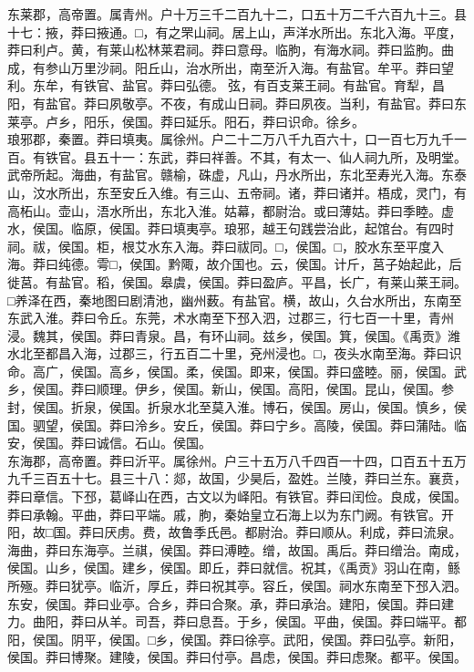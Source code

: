 \documentclass[]{article}
\begin{document}
东莱郡，高帝置。属青州。户十万三千二百九十二，口五十万二千六百九十三。县十七：掖，莽曰掖通。□，有之罘山祠。居上山，声洋水所出。东北入海。平度，莽曰利卢。黄，有莱山松林莱君祠。莽曰意母。临朐，有海水祠。莽曰监朐。曲成，有参山万里沙祠。阳丘山，治水所出，南至沂入海。有盐官。牟平。莽曰望利。东牟，有铁官、盐官。莽曰弘德。弦，有百支莱王祠。有盐官。育犁，昌阳，有盐官。莽曰夙敬亭。不夜，有成山日祠。莽曰夙夜。当利，有盐官。莽曰东莱亭。卢乡，阳乐，侯国。莽曰延乐。阳石，莽曰识命。徐乡。\\
琅邪郡，秦置。莽曰填夷。属徐州。户二十二万八千九百六十，口一百七万九千一百。有铁官。县五十一：东武，莽曰祥善。不其，有太一、仙人祠九所，及明堂。武帝所起。海曲，有盐官。赣榆，硃虚，凡山，丹水所出，东北至寿光入海。东泰山，汶水所出，东至安丘入维。有三山、五帝祠。诸，莽曰诸并。梧成，灵门，有高柘山。壶山，浯水所出，东北入淮。姑幕，都尉治。或曰薄姑。莽曰季睦。虚水，侯国。临原，侯国。莽曰填夷亭。琅邪，越王句践尝治此，起馆台。有四时祠。祓，侯国。柜，根艾水东入海。莽曰祓同。□，侯国。□，胶水东至平度入海。莽曰纯德。雩□，侯国。黔陬，故介国也。云，侯国。计斤，莒子始起此，后徙莒。有盐官。稻，侯国。皋虞，侯国。莽曰盈庐。平昌，长广，有莱山莱王祠。□养泽在西，秦地图曰剧清池，幽州薮。有盐官。横，故山，久台水所出，东南至东武入淮。莽曰令丘。东莞，术水南至下邳入泗，过郡三，行七百一十里，青州浸。魏其，侯国。莽曰青泉。昌，有环山祠。兹乡，侯国。箕，侯国。《禹贡》潍水北至都昌入海，过郡三，行五百二十里，兗州浸也。□，夜头水南至海。莽曰识命。高广，侯国。高乡，侯国。柔，侯国。即来，侯国。莽曰盛睦。丽，侯国。武乡，侯国。莽曰顺理。伊乡，侯国。新山，侯国。高阳，侯国。昆山，侯国。参封，侯国。折泉，侯国。折泉水北至莫入淮。博石，侯国。房山，侯国。慎乡，侯国。驷望，侯国。莽曰泠乡。安丘，侯国。莽曰宁乡。高陵，侯国。莽曰蒲陆。临安，侯国。莽曰诚信。石山。侯国。\\
东海郡，高帝置。莽曰沂平。属徐州。户三十五万八千四百一十四，口百五十五万九千三百五十七。县三十八：郯，故国，少昊后，盈姓。兰陵，莽曰兰东。襄贲，莽曰章信。下邳，葛峄山在西，古文以为峄阳。有铁官。莽曰闰俭。良成，侯国。莽曰承翰。平曲，莽曰平端。戚，朐，秦始皇立石海上以为东门阙。有铁官。开阳，故□国。莽曰厌虏。费，故鲁季氏邑。都尉治。莽曰顺从。利成，莽曰流泉。海曲，莽曰东海亭。兰祺，侯国。莽曰溥睦。缯，故国。禹后。莽曰缯治。南成，侯国。山乡，侯国。建乡，侯国。即丘，莽曰就信。祝其，《禹贡》羽山在南，鲧所殛。莽曰犹亭。临沂，厚丘，莽曰祝其亭。容丘，侯国。祠水东南至下邳入泗。东安，侯国。莽曰业亭。合乡，莽曰合聚。承，莽曰承治。建阳，侯国。莽曰建力。曲阳，莽曰从羊。司吾，莽曰息吾。于乡，侯国。平曲，侯国。莽曰端平。都阳，侯国。阴平，侯国。□乡，侯国。莽曰徐亭。武阳，侯国。莽曰弘亭。新阳，侯国。莽曰博聚。建陵，侯国。莽曰付亭。昌虑，侯国。莽曰虑聚。都平。侯国。\\
\end{document}
